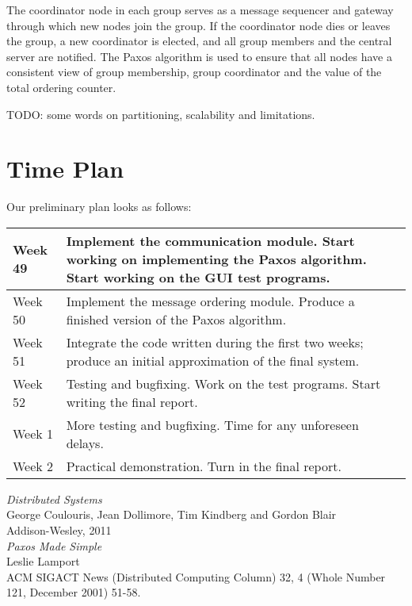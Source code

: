 \documentclass[10pt, oneside]{article}
\begin{document}
The coordinator node in each group serves as a message sequencer and gateway
through which new nodes join the group. If the coordinator node dies or leaves
the group, a new coordinator is elected, and all group members and the central
server are notified. The Paxos algorithm\cite{Paxos} is used to ensure that all
nodes have a consistent view of group membership, group coordinator and the
value of the total ordering counter.

TODO: some words on partitioning, scalability and limitations.


\section{Time Plan}

Our preliminary plan looks as follows:

\begin{tabular}{|l|p{10cm}|}
  \hline
  Week 49 & Implement the communication module. Start working on implementing the
  Paxos algorithm. Start working on the GUI test programs. \\
  \hline
  Week 50 & Implement the message ordering module. Produce a finished version of the Paxos algorithm. \\
  \hline
  Week 51 & Integrate the code written during the first two weeks; produce an
  initial approximation of the final system. \\
  \hline
  Week 52 & Testing and bugfixing. Work on the test programs. Start writing the final report. \\
  \hline
  Week 1  & More testing and bugfixing. Time for any unforeseen delays. \\
  \hline
  Week 2  & Practical demonstration. Turn in the final report. \\
  \hline
\end{tabular}

\begin{thebibliography}{9}

 \emph{Distributed Systems}\\
\newblock George Coulouris, Jean Dollimore, Tim Kindberg and Gordon Blair\\
\newblock Addison-Wesley, 2011\\

 \emph{Paxos Made Simple}\\
\newblock Leslie Lamport\\
\newblock ACM SIGACT News (Distributed Computing Column) 32, 4 (Whole Number
121, December 2001) 51-58.\\

\end{thebibliography}
\end{document}
